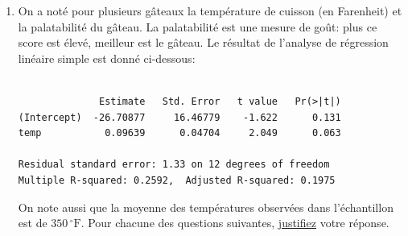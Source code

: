 \documentclass[a4paper, 11pt]{article}
\begin{document}
{\begin{enumerate}
\newpage 
 \begin{verbatim}
                  Procédure REG
                 Modèle : MODEL1
                 Variable dépendante : consom
                 
 Nombre d'observations lues                             20
 Nombre d'observations utilisées                        20


                    Analyse de variance

                              Somme des       Moyenne   Valeur
Source                 DDL       carrés   quadratique     de F   Pr > F

Modèle                   1    146.96404            ?       BBB       ?
Erreur                 AAA     27.75346      1.54186
Total sommes corrigées   ?            ?


Racine MSE   1.24172       R carré     CCC


                  Valeurs estimées des paramètres

                  Valeur estimée    Erreur
Variable    DDL   des paramètres      type    Valeur test t    Pr > |t|

Intercept     1         5.76226    0.72256             DDD       <.0001
cylind        1         2.03523          ?            9.76       <.0001



 \end{verbatim}
 
\newpage

\item On a noté pour plusieurs gâteaux la température de cuisson (en Farenheit) et la palatabilité du gâteau. La palatabilité est une mesure de goût: plus ce score est élevé, meilleur est le gâteau. Le résultat de l'analyse de régression linéaire simple est donné ci-dessous: 

\begin{verbatim}

              Estimate   Std. Error   t value   Pr(>|t|)  
(Intercept)  -26.70877     16.46779    -1.622      0.131  
temp           0.09639      0.04704     2.049      0.063 

Residual standard error: 1.33 on 12 degrees of freedom
Multiple R-squared: 0.2592,	 Adjusted R-squared: 0.1975 

\end{verbatim}
On note aussi que la moyenne des températures observées dans l'échantillon est de $350\,^{\circ}\mathrm{F}$. Pour chacune des questions suivantes, \underline{justifiez} votre réponse.
\vspace{0.1 in}


\end{enumerate}}
\end{document}
